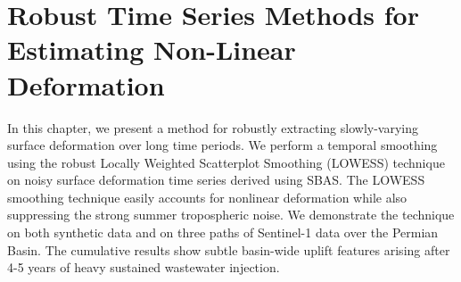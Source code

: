 %



\chapter{Robust Time Series Methods for Estimating Non-Linear Deformation}
\label{CHAP:5-robust-ts}


In this chapter, we present a method for robustly extracting slowly-varying surface deformation over long time periods.
We perform a temporal smoothing using the robust Locally Weighted Scatterplot Smoothing (LOWESS) technique \citep{Cleveland1979RobustLocallyWeighted} on noisy surface deformation time series derived using SBAS.
The LOWESS smoothing technique easily accounts for nonlinear deformation while also suppressing the strong summer tropospheric noise.
We demonstrate the technique on both synthetic data and on three paths of Sentinel-1 data over the Permian Basin.
The cumulative results show subtle basin-wide uplift features arising after 4-5 years of heavy sustained wastewater injection.



%	

